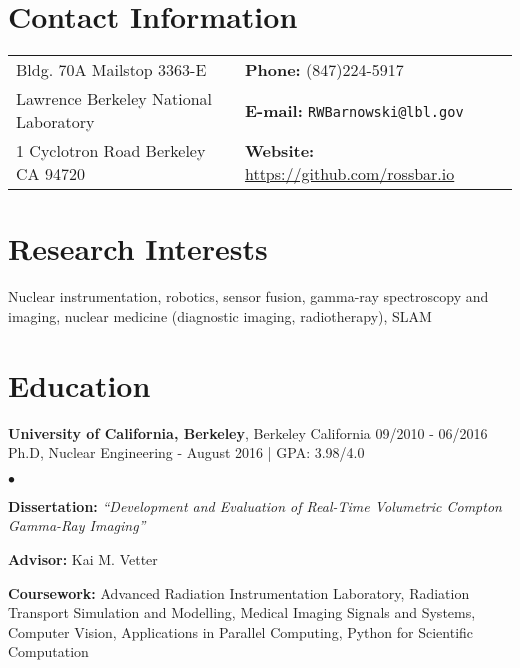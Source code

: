 \documentclass[margin,line]{res}
\newenvironment{list2}{
  \begin{list}{$\bullet$}{%
      \setlength{\itemsep}{0in}
      \setlength{\parsep}{0in} \setlength{\parskip}{0in}
      \setlength{\topsep}{0in} \setlength{\partopsep}{0in} 
      \setlength{\leftmargin}{0.2in}}}{\end{list}}
\begin{document}
\address{\large Postdoctoral Scholar, Applied Nuclear Physics}
\address{\large Lawrence Berkeley National Laboratory}

\begin{resume}
\section{\sc Contact Information}
\vspace{.05in}
\begin{tabular}{@{}p{3in}p{4in}}
Bldg. 70A Mailstop 3363-E             & {\bf Phone:}   (847)224-5917 \\            
Lawrence Berkeley National Laboratory & {\bf E-mail:}  {\tt RWBarnowski@lbl.gov} \\       
1 Cyclotron Road Berkeley CA 94720    & {\bf Website:} \url{https://github.com/rossbar.io} \\     
\end{tabular}


\section{\sc Research Interests}
Nuclear instrumentation, robotics, sensor fusion, gamma-ray spectroscopy and 
imaging, nuclear medicine (diagnostic imaging, radiotherapy), SLAM

\section{\sc Education}
{\bf University of California, Berkeley}, Berkeley California \hfill 09/2010 - 06/2016\\
Ph.D, Nuclear Engineering - August 2016 | GPA: 3.98/4.0
\begin{list2}
\item {\bf \small Dissertation:} {\em``Development and Evaluation of Real-Time
                                        Volumetric Compton Gamma-Ray Imaging''} 
\item {\bf \small Advisor:}  Kai M. Vetter
\item {\bf \small Coursework:} Advanced Radiation Instrumentation Laboratory,
                               Radiation Transport Simulation and Modelling,
                               Medical Imaging Signals and Systems, Computer
                               Vision, Applications in Parallel Computing,
                               Python for Scientific Computation
\end{list2}


\end{resume}
\end{document}
